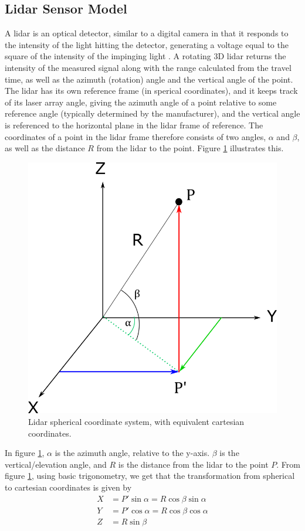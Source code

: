 \subsection{Lidar Sensor Model}
A lidar is an optical detector, similar to a digital camera in that it responds to the intensity of the light hitting the detector, generating a voltage equal to the square of the intensity of the impinging light \cite{SpieLidar}. A rotating 3D lidar returns the intensity of the measured signal along with the range calculated from the travel time, as well as the azimuth (rotation) angle and the vertical angle of the point. The lidar has its own reference frame (in sperical coordinates), and it keeps track of its laser array angle, giving the azimuth angle of a point relative to some reference angle (typically determined by the manufacturer), and the vertical angle is referenced to the horizontal plane in the lidar frame of reference. The coordinates of a point in the lidar frame therefore consists of two angles, $\alpha$ and $\beta$, as well as the distance $R$ from the lidar to the point. Figure \ref{fig:lidar_spherical} illustrates this.
\begin{figure}[H]
    \centering
    \includegraphics[width=.6\linewidth]{fig/sperical_to_cartesian.png}
    \caption{Lidar spherical coordinate system, with equivalent cartesian coordinates.}
    \label{fig:lidar_spherical}
\end{figure}
In figure \ref{fig:lidar_spherical}, $\alpha$ is the azimuth angle, relative to the y-axis. $\beta$ is the vertical/elevation angle, and $R$ is the distance from the lidar to the point $P$.
From figure \ref{fig:lidar_spherical}, using basic trigonometry, we get that the transformation from spherical to cartesian coordinates is given by
\begin{equation}
\label{eq:spheric_to_cartesian}
    \begin{split}
        X&=P'\sin{\alpha}=R\cos{\beta}\sin{\alpha}\\
        Y&=P'\cos{\alpha}=R\cos{\beta}\cos{\alpha}\\
        Z&=R\sin{\beta}
    \end{split}
\end{equation}
